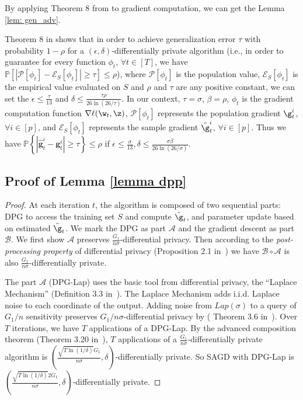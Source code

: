By applying Theorem 8 from \citet{dwfe2015a} to gradient computation, we can get the Lemma \ref{lem: gen_adv}.

\lemgenadv*

\proof 
Theorem 8 in \citet{dwfe2015a}  shows that in order to achieve generalization error $\tau$ with probability $1-\rho$ for a $(\epsilon, \delta)$-differentially private algorithm (i.e., in order
to guarantee for every function $\phi_t$, $\forall t \in [T]$, we have $\mathbb{P}\left[\left|\mathcal{P}\left[\phi_t\right]-\mathcal{E}_{S}\left[\phi_t\right]\right| \geq \tau\right] \leq \rho$), where $\mathcal{P}\left[\phi_t\right]$ is the population value, $\mathcal{E}_{S}\left[\phi_t\right]$ is the empirical value evaluated on $S$ and $\rho$ and $\tau$ are any positive constant, we can set the $\epsilon \leq \frac{\tau}{13}$ and $\delta \leq \frac{\tau \rho}{26 \ln (26 / \tau)}$. In our context, $\tau = \sigma$, $\beta =\rho$, $\phi_t$ is 
the gradient computation function $\nabla \ell(\w_t,\z)$,  $\mathcal{P}\left[\phi_t\right]$ represents the population gradient $\g_t^i$, $\forall i\in [p]$, and $\mathcal{E}_{S}\left[\phi_t\right]$ represents the sample gradient $\hat \g_t^i$, $\forall i\in [p]$. Thus we have $\mathbb{P}\left\{\left|\hat{\mathbf{g}}_{t}^{i}-\mathbf{g}_{t}^{i}\right| \geq \tau\right\} \leq \rho$ if $\epsilon \leq \frac{\sigma}{13}, \delta \leq \frac{\sigma \beta}{26 \ln (26 / \sigma)}$.

\subsection{Proof of Lemma \ref{lemma dpp}}


\lemdpp*

\begin{proof}
At each iteration $t$, the algorithm is composed of two sequential parts: DPG to access the training set $S$ and compute $\tilde \g_t$, and parameter update based on estimated $\tilde \g_t$. We mark the DPG as part $\mathcal{A}$ and the gradient descent as part $\mathcal{B}$. We first show $\mathcal{A}$ preserves $\frac{G_1}{n\sigma}$-differential privacy. Then according to the \emph{post-processing property} of differential privacy (Proposition 2.1 in~\cite{dwro2014}) we have $\mathcal{B} \circ \mathcal{A}$ is also $\frac{G_1}{n\sigma}$-differentially private.
	
The part $\mathcal{A}$ (DPG-Lap) uses the basic tool from differential privacy, the ``Laplace Mechanism'' (Definition 3.3 in~\citep{dwro2014}). 
The Laplace Mechanism adds i.i.d. Laplace noise to each coordinate of the output. Adding noise from $Lap(\sigma)$ to a query of $G_1/n$
 sensitivity preserves $G_1/n\sigma$-differential privacy by ( Theorem 3.6 in~\cite{dwro2014}).
 Over $T$ iterations, we have $T$ applications of a DPG-Lap. By the advanced composition theorem (Theorem 3.20 in~\cite{dwro2014}), $T$ applications of a $\frac{G_1}{n\sigma}$-differentially private algorithm is $(\frac{\sqrt{T \ln(1/\delta)} G_1}{n\sigma}, \delta)$-differentially private. 
 So SAGD with DPG-Lap is $(\frac{\sqrt{T \ln(1/\delta)} 2G_1}{n\sigma}, \delta)$-differentially private.
\end{proof}

